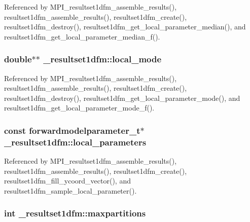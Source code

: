 Referenced by M\+P\+I\+\_\+resultset1dfm\+\_\+assemble\+\_\+results(), resultset1dfm\+\_\+assemble\+\_\+results(), resultset1dfm\+\_\+create(), resultset1dfm\+\_\+destroy(), resultset1dfm\+\_\+get\+\_\+local\+\_\+parameter\+\_\+median(), and resultset1dfm\+\_\+get\+\_\+local\+\_\+parameter\+\_\+median\+\_\+f().

\subsubsection[{\texorpdfstring{local\+\_\+mode}{local_mode}}]{\setlength{\rightskip}{0pt plus 5cm}double$\ast$$\ast$ \+\_\+resultset1dfm\+::local\+\_\+mode}\hypertarget{struct__resultset1dfm_a9f756b2dcafab255fcd1cd2180d167af}{}\label{struct__resultset1dfm_a9f756b2dcafab255fcd1cd2180d167af}


Referenced by M\+P\+I\+\_\+resultset1dfm\+\_\+assemble\+\_\+results(), resultset1dfm\+\_\+assemble\+\_\+results(), resultset1dfm\+\_\+create(), resultset1dfm\+\_\+destroy(), resultset1dfm\+\_\+get\+\_\+local\+\_\+parameter\+\_\+mode(), and resultset1dfm\+\_\+get\+\_\+local\+\_\+parameter\+\_\+mode\+\_\+f().

\subsubsection[{\texorpdfstring{local\+\_\+parameters}{local_parameters}}]{\setlength{\rightskip}{0pt plus 5cm}const {\bf forwardmodelparameter\+\_\+t}$\ast$ \+\_\+resultset1dfm\+::local\+\_\+parameters}\hypertarget{struct__resultset1dfm_acdda95a91c2722e8dae38e82a955d1f0}{}\label{struct__resultset1dfm_acdda95a91c2722e8dae38e82a955d1f0}


Referenced by M\+P\+I\+\_\+resultset1dfm\+\_\+assemble\+\_\+results(), resultset1dfm\+\_\+assemble\+\_\+results(), resultset1dfm\+\_\+create(), resultset1dfm\+\_\+fill\+\_\+ycoord\+\_\+vector(), and resultset1dfm\+\_\+sample\+\_\+local\+\_\+parameter().

\subsubsection[{\texorpdfstring{maxpartitions}{maxpartitions}}]{\setlength{\rightskip}{0pt plus 5cm}int \+\_\+resultset1dfm\+::maxpartitions}\hypertarget{struct__resultset1dfm_ab9a205a37ed1e99e0f292a8a81e4fa8a}{}\label{struct__resultset1dfm_ab9a205a37ed1e99e0f292a8a81e4fa8a}


